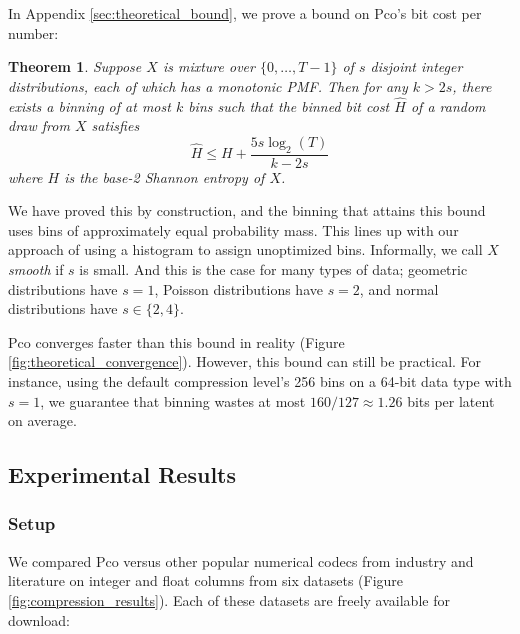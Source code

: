 \documentclass[letterpaper]{article}
\newtheorem{theorem}{Theorem}
\begin{document}
In Appendix \ref{sec:theoretical_bound}, we prove a bound on Pco's bit cost per number:

\begin{theorem}
  Suppose $X$ is mixture over $\{0, \ldots, T - 1\}$ of $s$ disjoint integer distributions, each of which has a monotonic PMF.
  Then for any $k>2s$, there exists a binning of at most $k$ bins such that the binned bit cost $\hat{H}$ of a random draw from $X$ satisfies
\[\hat{H} \le H + \frac{5s\log_2(T)}{k-2s}\]
where $H$ is the base-2 Shannon entropy of $X$.
\label{thm:bound}
\end{theorem}

We have proved this by construction, and the binning that attains this bound uses bins of approximately equal probability mass.
This lines up with our approach of using a histogram to assign unoptimized bins.
Informally, we call $X$ \emph{smooth} if $s$ is small.
And this is the case for many types of data; geometric distributions have $s=1$, Poisson distributions have $s=2$, and normal distributions have $s \in \{2, 4\}$.

Pco converges faster than this bound in reality (Figure \ref{fig:theoretical_convergence}).
However, this bound can still be practical.
For instance, using the default compression level's 256 bins on a 64-bit data type with $s=1$, we guarantee that binning wastes at most $160/127 \approx 1.26$ bits per latent on average.

\subsection{Experimental Results}

\subsubsection{Setup}

We compared Pco versus other popular numerical codecs from industry and literature on integer and float columns from six datasets (Figure \ref{fig:compression_results}).
Each of these datasets are freely available for download:
\end{document}
